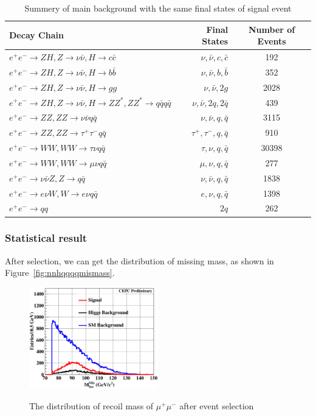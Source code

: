 \documentclass[11pt,a4paper]{cepcnote}
\begin{document}
\begin{table}[H]
\begin{center}
\begin{tabular}{lrc}
\hline\hline
Decay Chain	& Final States 	&	Number of Events\\
\hline
$e^+e^-\rightarrow ZH, Z\rightarrow \nu\bar{\nu}, H\rightarrow c\bar{c}$ & $\nu, \bar{\nu}, c, \bar{c}$			&192	\\
$e^+e^-\rightarrow ZH, Z\rightarrow \nu\bar{\nu}, H\rightarrow b\bar{b}$ & $\nu, \bar{\nu}, b, \bar{b}$			&352	\\
$e^+e^-\rightarrow ZH, Z\rightarrow \nu\bar{\nu}, H\rightarrow gg$ 		 & $\nu, \bar{\nu}, 2g		  $			&2028	\\
$e^+e^-\rightarrow ZH, Z\rightarrow \nu\bar{\nu}, H\rightarrow ZZ^*, ZZ^*\rightarrow q\bar{q}q\bar{q}$ &
																$\nu, \bar{\nu}, 2q, 2\bar{q}$&		439\\	
$e^+e^-\rightarrow ZZ, ZZ\rightarrow \nu\bar{\nu}q\bar{q}$      & $\nu, \bar{\nu}, q, \bar{q}$					&3115	\\
$e^+e^-\rightarrow ZZ, ZZ\rightarrow \tau^+\tau^-q\bar{q}$ 		& $\tau^+, \tau^-, q, \bar{q}$					&910	\\
$e^+e^-\rightarrow WW, WW\rightarrow \tau\nu q\bar{q}$        	& $\tau, \nu, q, \bar{q}$						&	30398\\
$e^+e^-\rightarrow WW, WW\rightarrow \mu\nu q\bar{q}$        	& $\mu, \nu, q, \bar{q}$						&	277\\
$e^+e^-\rightarrow \nu\bar{\nu} Z, Z\rightarrow q\bar{q}$ 		& $\nu, \bar{\nu}, q, \bar{q}$					&	1838\\
$e^+e^-\rightarrow e\nu W, W\rightarrow e\nu q\bar{q}$        	& $e, \nu, q, \bar{q}$							&	1398\\
$e^+e^-\rightarrow qq$											& $2q$											&262 \\
\hline\hline
\end{tabular}
\caption{Summery of main background with the same final states of signal event}
\label{tab:nnqqqqbkg}
\end{center}
\end{table}

\subsubsection{Statistical result}
After selection, we can get the distribution of missing mass, as shown in Figure~\ref{fig:nnhqqqqmismass}.
\begin{figure}[H]
\centering
\includegraphics[width=0.5\textwidth]{nnH/fourq/MisMass_AF}
\label{fig:eehuvqqrecfit}
\caption[]{The distribution of recoil mass of $\mu^+\mu^-$ after event selection}
\end{figure}
\end{document}
